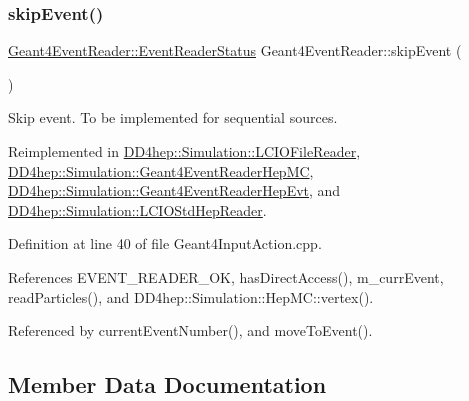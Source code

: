 \subsubsection{\texorpdfstring{skip\+Event()}{skipEvent()}}
{\footnotesize\ttfamily \hyperlink{class_d_d4hep_1_1_simulation_1_1_geant4_event_reader_ae4f4bc83ffcf5b0c1868ad78859851e7}{Geant4\+Event\+Reader\+::\+Event\+Reader\+Status} Geant4\+Event\+Reader\+::skip\+Event (\begin{DoxyParamCaption}{ }\end{DoxyParamCaption})\hspace{0.3cm}{\ttfamily [virtual]}}



Skip event. To be implemented for sequential sources. 



Reimplemented in \hyperlink{class_d_d4hep_1_1_simulation_1_1_l_c_i_o_file_reader_a4b14dad308419f968982e216c11bb15a}{D\+D4hep\+::\+Simulation\+::\+L\+C\+I\+O\+File\+Reader}, \hyperlink{class_d_d4hep_1_1_simulation_1_1_geant4_event_reader_hep_m_c_a02a4d905385f3b587ffe953e129aad5f}{D\+D4hep\+::\+Simulation\+::\+Geant4\+Event\+Reader\+Hep\+MC}, \hyperlink{class_d_d4hep_1_1_simulation_1_1_geant4_event_reader_hep_evt_a643c4f3e44964b0a5692b5b169ada9e6}{D\+D4hep\+::\+Simulation\+::\+Geant4\+Event\+Reader\+Hep\+Evt}, and \hyperlink{class_d_d4hep_1_1_simulation_1_1_l_c_i_o_std_hep_reader_a54ae13b39268486b6edc4a7f9a11ada3}{D\+D4hep\+::\+Simulation\+::\+L\+C\+I\+O\+Std\+Hep\+Reader}.



Definition at line 40 of file Geant4\+Input\+Action.\+cpp.



References E\+V\+E\+N\+T\+\_\+\+R\+E\+A\+D\+E\+R\+\_\+\+OK, has\+Direct\+Access(), m\+\_\+curr\+Event, read\+Particles(), and D\+D4hep\+::\+Simulation\+::\+Hep\+M\+C\+::vertex().



Referenced by current\+Event\+Number(), and move\+To\+Event().



\subsection{Member Data Documentation}
\hypertarget{class_d_d4hep_1_1_simulation_1_1_geant4_event_reader_a3f1446121fae285cd2772ca9bd1d8af3}{}\label{class_d_d4hep_1_1_simulation_1_1_geant4_event_reader_a3f1446121fae285cd2772ca9bd1d8af3} 
